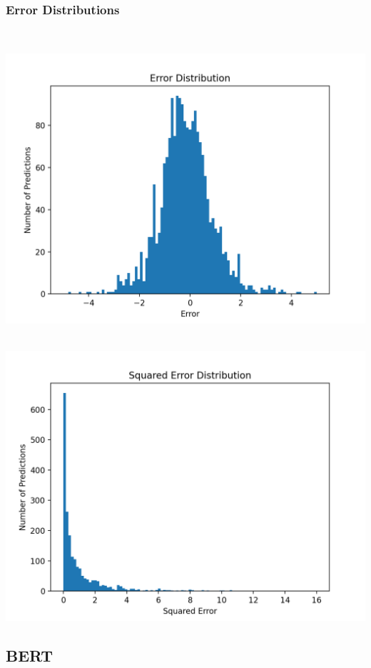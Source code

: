 \documentclass[11pt]{article}
\begin{document}
\subsubsection{Error Distributions}
\mbox{}\\
\begin{minipage}{0.45\textwidth}
\includegraphics[scale=0.5]{bert/error.png}
\end{minipage}
\hfill
\begin{minipage}{0.45\textwidth}
\mbox{}\\
\includegraphics[scale=0.5]{bert/squared_error.png}
\end{minipage}


\subsection{BERT}
\end{document}
